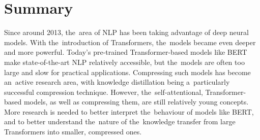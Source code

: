 \documentclass[bsc,frontabs,singlespacing,parskip,deptreport]{infthesis}
\begin{document}
{{    %
  }

  \section{Summary}{
    Since around 2013, the~area of NLP has been taking advantage of deep neural models.
    With the~introduction of Transformers, the~models became even deeper and more powerful.
    Today's pre-trained Transformer-based models like BERT make state-of-the-art NLP relatively accessible, but the~models are often too large and slow for practical applications.
    Compressing such models has become an~active research area, with knowledge distillation being a~particularly successful compression technique.
    However, the~self-attentional, Transformer-based models, as well as compressing them, are still relatively young concepts.
    More research is needed to better interpret the~behaviour of models like BERT, and to better understand the~nature of the~knowledge transfer from large Transformers into smaller, compressed ones.
  }
}
\end{document}
